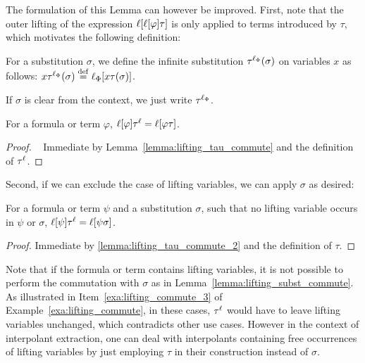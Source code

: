 The formulation of this Lemma can however be improved.
First, note that the outer lifting of the expression $\ell[\ell[\varphi]\tau]$ is only applied to terms introduced by $\tau$, which motivates the following definition:

\begin{defi}[$\tauell$]
	For a substitution $\sigma$, we define the infinite substitution $\tau^{\ell_\Phi}(\sigma)$ on variables $x$ as follows: 
	$x\tauellphi(\sigma) \spas\defeq \lifphinovar{x\tau(\sigma)}$.

	If $\sigma$ is clear from the context, we just write $\tau^{\ell_\Phi}$.
\end{defi}



\begin{lemma}
	\label{lemma:lifting_tau_commute_2}
	For a formula or term $\varphi$,
	$\ell[\varphi]\tau^\ell = \ell[\varphi\tau]$.
\end{lemma}
\begin{proof}~
	Immediate by Lemma~\ref{lemma:lifting_tau_commute} and the definition of $\tauell$.
\end{proof}

Second, if we can exclude the case of lifting variables, we can apply $\sigma$ as desired:
\begin{lemma}
	\label{lemma:lifting_subst_commute}
	For a formula or term $\psi$ and a substitution $\sigma$, such that no lifting variable occurs in $\psi$ or $\sigma$,
	$\ell[\psi]\tau^\ell = \ell[\psi\sigma]$.
\end{lemma}
\begin{proof}
	Immediate by \ref{lemma:lifting_tau_commute_2} and the definition of $\tau$.
\end{proof}

Note that if the formula or term contains lifting variables,
it is not possible to perform the commutation with $\sigma$ as in Lemma~\ref{lemma:lifting_subst_commute}.
As illustrated in Item~\ref{exa:lifting_commute_3} of Example~\ref{exa:lifting_commute}, in these cases, $\tauell$ would have to leave lifting variables unchanged, which contradicts other use cases.
However in the context of interpolant extraction, one can deal with interpolants containing free occurrences of lifting variables by just employing $\tau$ in their construction instead of $\sigma$.




